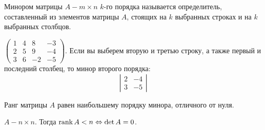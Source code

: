	\begin{Def}
		Минором матрицы $A - m \times n$ $k$-го порядка называется определитель, 
		составленный из элементов матрицы $A$, стоящих на $k$ выбранных строках и на $k$ выбранных столбцов.  
	\end{Def}

	\begin{Example}
		$\left(\begin{array}{cccc}
		1 & 4 & 8 & -3 \\ 
		2 & 5 & 9 & -4 \\ 
		3 & 6 & -2 & -5
		\end{array}\right)$. Если вы выберем вторую и третью строку, а также первый и последний столбец, то минор второго порядка:
		\[\left|\begin{array}{cc}
		2 & -4 \\ 
		3 & -5
		\end{array}\right|\]
	\end{Example}

	\begin{Thm}
		Ранг матрицы $A$ равен наибольшему порядку минора, отличного от нуля.
	\end{Thm}

	\begin{Thm}
		$A - n \times n$. Тогда $\operatorname{rank} A < n \Leftrightarrow \det A = 0$.
	\end{Thm}

